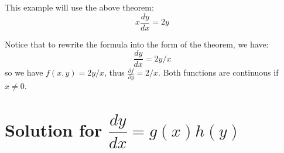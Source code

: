 \begin{example}
   This example will use the above theorem:
   \[
    x \dfrac{dy}{dx} = 2y
   \]

   Notice that to rewrite the formula into the form of the theorem, we have:
   \[
    \dfrac{dy}{dx} = 2y/x
   \]
    so we have \(f(x, y) = 2y/x\), thus \(\frac{\partial f}{\partial y} = 2/x\). 
    Both functions are continuous if \(x \neq 0\). 
\end{example}

\section{Solution for \(\dfrac{dy}{dx} = g(x)h(y)\)}